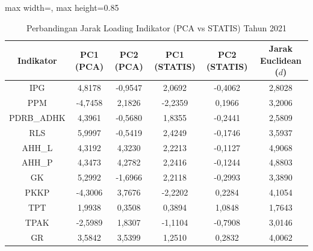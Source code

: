 \begin{table}[H]
\centering
\caption{Perbandingan Jarak Loading Indikator (PCA vs STATIS) Tahun 2021} \label{tab:app2jarak_loading_2021}
\begin{adjustbox}{max width=\textwidth, max height=0.85\textheight}
\begin{tabular}{|c|c|c|c|c|c|}
\hline
\textbf{Indikator} & \textbf{PC1 (PCA)} & \textbf{PC2 (PCA)} & \textbf{PC1 (STATIS)} & \textbf{PC2 (STATIS)} & \textbf{Jarak Euclidean ($d$)} \\
\hline
IPG & 4,8178 & -0,9547 & 2,0692 & -0,4062 & 2,8028 \\
PPM & -4,7458 & 2,1826 & -2,2359 & 0,1966 & 3,2006 \\
PDRB\_ADHK & 4,3961 & -0,5680 & 1,8355 & -0,2441 & 2,5809 \\
RLS & 5,9997 & -0,5419 & 2,4249 & -0,1746 & 3,5937 \\
AHH\_L & 4,3192 & 4,3230 & 2,2213 & -0,1127 & 4,9068 \\
AHH\_P & 4,3473 & 4,2782 & 2,2416 & -0,1244 & 4,8803 \\
GK & 5,2992 & -1,6966 & 2,2118 & -0,2993 & 3,3890 \\
PKKP & -4,3006 & 3,7676 & -2,2202 & 0,2284 & 4,1054 \\
TPT & 1,9938 & 0,3508 & 0,3894 & 1,0848 & 1,7643 \\
TPAK & -2,5989 & 1,8307 & -1,1104 & -0,7908 & 3,0146 \\
GR & 3,5842 & 3,5399 & 1,2510 & 0,2832 & 4,0062 \\
\hline
\end{tabular}
\end{adjustbox}
\end{table}